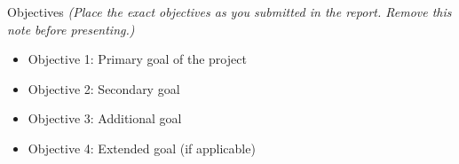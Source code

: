 
\begin{frame}{Objectives}
    {\small\textit{(Place the exact objectives as you submitted in the report. Remove this note before presenting.)}}
    \vspace{0.5em}
    \begin{itemize}
        \item Objective 1: Primary goal of the project
        \item Objective 2: Secondary goal
        \item Objective 3: Additional goal
        \item Objective 4: Extended goal (if applicable)
    \end{itemize}
\end{frame}
